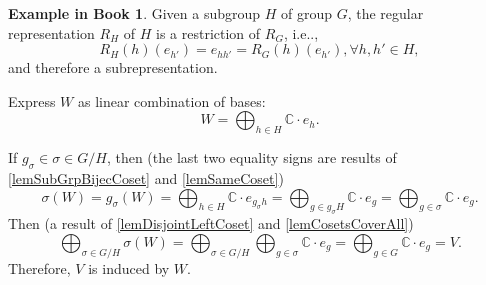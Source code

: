 \documentclass[12pt, letterpaper]{article}
\makeatletter
\newcommand{\co}{\mathbb{C}}
\newcommand\ie{i.e\@ifnextchar.{}{.\@}}
\newcommand{\red}[1]{{\color{red} #1}}
\theoremstyle{definition}
\theoremstyle{remark}
\theoremstyle{definition}
\newtheorem{exam}[exe]{Example in Book}
\theoremstyle{plain}
\numberwithin{equation}{section}
\makeatother
\begin{document}
	\begin{exam}
		Given a subgroup $H$ of group $G$, the regular representation $R_H$
		of $H$ is a restriction of $R_G$, \ie,
		\[ R_H(h)(e_{h'})=e_{hh'}=R_G(h)(e_{h'}),\forall h,h'\in H, \]
		and therefore a subrepresentation.
		
		Express $W$ as linear combination of bases:
		\[W=\bigoplus_{h\in H}\co\cdot e_h.\]
		
		If $g_{\sigma}\in\sigma\in G/H$, then
		(the last two equality signs are results of \ref{lemSubGrpBijecCoset} and \ref{lemSameCoset})
		\[\sigma (W) = g_{\sigma} (W)=\bigoplus_{h\in H}\co\cdot e_{g_{\sigma}h}=\bigoplus_{g\in g_\sigma H}\co\cdot e_{g}=\bigoplus_{g\in \sigma}\co\cdot e_{g}.\]
		Then (a result of \ref{lemDisjointLeftCoset} and \ref{lemCosetsCoverAll})
		\[\bigoplus_{\sigma\in G/H} \sigma (W)= \bigoplus_{\sigma\in G/H}\bigoplus_{g\in \sigma}\co\cdot e_{g}=\bigoplus_{g\in G}
		\co\cdot e_g=V. \]
		Therefore, $V$ is induced by $W$.
	\end{exam}
	
\end{document}
